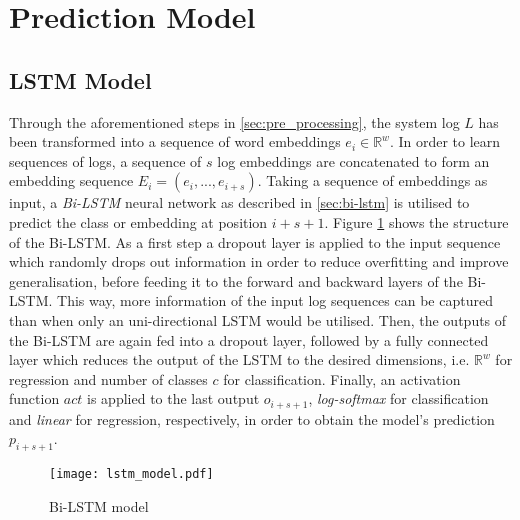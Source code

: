 \section{Prediction Model\label{sec:prediction_model}}

\subsection{LSTM Model\label{sec:lstm-model}}
Through the aforementioned steps in \ref{sec:pre_processing}, the system log $L$ has been transformed into a sequence of word embeddings $e_i \in \mathbb{R}^w$. In order to learn sequences of logs, a sequence of $s$ log embeddings are concatenated to form an embedding sequence $E_i = (e_i,...,e_{i+s})$. Taking a sequence of embeddings as input, a \textit{Bi-LSTM} neural network as described in \ref{sec:bi-lstm} is utilised to predict the class or embedding at position $i+s+1$. Figure \ref{fig:lstm_model} shows the structure of the Bi-LSTM. As a first step a dropout layer is applied to the input sequence which randomly drops out information in order to reduce overfitting and improve generalisation, before feeding it to the forward and backward layers of the Bi-LSTM. This way, more information of the input log sequences can be captured than when only an uni-directional LSTM would be utilised. Then, the outputs of the Bi-LSTM are again fed into a dropout layer, followed by a fully connected layer which reduces the output of the LSTM to the desired dimensions, i.e. $\mathbb{R}^w$ for regression and number of classes $c$ for classification. Finally, an activation function $act$ is applied to the last output $o_{i+s+1}$, \textit{log-softmax} for classification and \textit{linear} for regression, respectively, in order to obtain the model's prediction $p_{i+s+1}$.


\begin{figure}[H]
	\centering	
	\texttt{[image: lstm\_model.pdf]}
	\caption{Bi-LSTM model}
	\label{fig:lstm_model}
\end{figure}
\newpage
